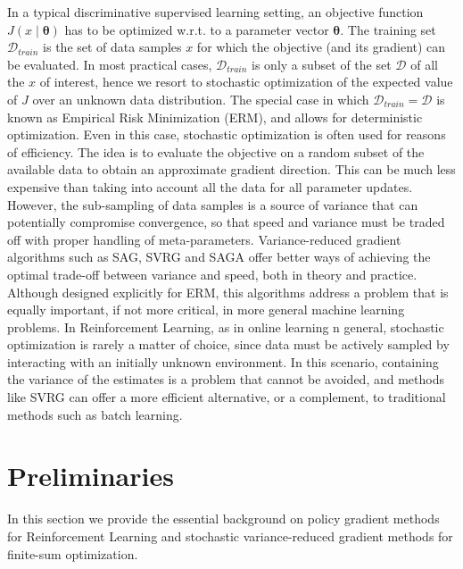 \documentclass{article}
\makeatletter
\theoremstyle{remark}
\theoremstyle{definition}
\DeclareRobustCommand{\ie}{i.e.,\@\xspace}
\DeclareRobustCommand{\wrt}{w.r.t.\@\xspace}
\newcommand{\todomat}[1]{\todo[color=citrine, inline]{\small #1}}
\newcommand{\vtheta}{\boldsymbol{\theta}}
\makeatother
\begin{document}
In a typical discriminative supervised learning setting, an objective function $J(x\mid\vtheta)$ has to be optimized \wrt to a parameter vector $\vtheta$. The training set $\mathcal{D}_{train}$ is the set of data samples $x$ for which the objective (and its gradient) can be evaluated. In most practical cases, $\mathcal{D}_{train}$ is only a subset of the set $\mathcal{D}$ of all the $x$ of interest, hence we resort to stochastic optimization of the expected value of $J$ over an unknown data distribution. The special case in which $\mathcal{D}_{train} = \mathcal{D}$ is known as Empirical Risk Minimization (ERM), and allows for deterministic optimization. Even in this case, stochastic optimization is often used for reasons of efficiency. The idea is to evaluate the objective on a random subset of the available data to obtain an approximate gradient direction. This can be much less expensive than taking into account all the data for all parameter updates. However, the sub-sampling of data samples is a source of variance that can potentially compromise convergence, so that speed and variance must be traded off with proper handling of meta-parameters.
Variance-reduced gradient algorithms such as SAG, SVRG and SAGA offer better ways of achieving the optimal trade-off between variance and speed, both in theory and practice. Although designed explicitly for ERM, this algorithms address a problem that is equally important, if not more critical, in more general machine learning problems.
In Reinforcement Learning, as in online learning n general, stochastic optimization is rarely a matter of choice, since data must be actively sampled by interacting with an initially unknown environment. In this scenario, containing the variance of the estimates is a problem that cannot be avoided, and methods like SVRG can offer a more efficient alternative, or a complement, to traditional methods such as batch learning.

\todomat{work in progress}


\section{Preliminaries}
In this section we provide the essential background on policy gradient methods for Reinforcement Learning and stochastic variance-reduced gradient methods for finite-sum optimization.
\end{document}
